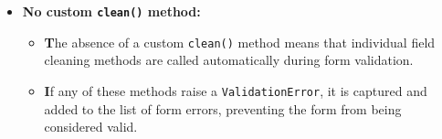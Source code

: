 \documentclass{report}
\begin{document}
\begin{itemize}
\begin{itemize}
            \item \textbf{No custom \texttt{clean()} method:}
            \begin{itemize}
                \item \textbf The absence of a custom \texttt{clean()} method means that individual field cleaning methods are called automatically during form validation.
                \item \textbf If any of these methods raise a \texttt{ValidationError}, it is captured and added to the list of form errors, preventing the form from being considered valid.
            \end{itemize}
        \end{itemize}


\end{itemize}
\end{document}
